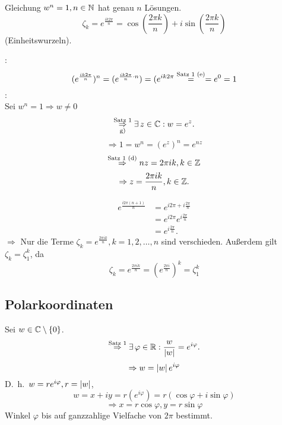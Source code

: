 \documentclass[../ana2.tex]{subfiles}
\begin{document}
\begin{kor}
    Gleichung \( w^n = 1, n \in \mathbb{N} \) hat 
    genau \(n\) Lösungen.
    \[ \zeta_k = e^{\frac{ik2\pi}{n}} 
    = \cos(\frac{2\pi k}{n}) + i \sin(\frac{2\pi k}{n}) \]
    (Einheitswurzeln).
\end{kor}
\begin{bew}
    \gqq{\(\Leftarrow \)}: 
    \[ (e^{\frac{i k 2 \pi}{n}})^n 
    = (e^{\frac{i k 2 \pi}{n} \cdot n}) 
    = (e^{i k 2 \pi} \overset{\text{Satz 1 (e)}}{=} = e^0 = 1 \]
    \gqq{\( \Rightarrow \)}: \\
    Sei \( w^n = 1 \Rightarrow w \neq 0 \)
    \[ \overundersett{Satz 1}{g)}{\Rightarrow} \exists z \in \C: w = e^z. \]
    \[ \Rightarrow 1 = w^n = (e^z)^n = e^{nz} \]
    \[ \overset{\text{Satz 1 (d)}}{\Rightarrow} n z = 2 \pi i k, k\in\mathbb{Z} \]
    \[ \Rightarrow z = \frac{2 \pi i k}{n}, k\in\mathbb{Z}. \]

    \begin{align*}
        e^{ \frac{i 2 \pi (n + 1)}{n} } 
        &= e^{i 2\pi + i \frac{2\pi}{n}} \\
        &= e^{i 2\pi} e^{i \frac{2\pi}{n}} \\
        &= e^{i \frac{2\pi}{n}}.
    \end{align*}
    \( \Rightarrow \) Nur die Terme 
    \( \zeta_k = e^{\frac{2\pi ik}{n}}, k=1,2,\dots,n \)
    sind verschieden.
    Außerdem gilt \( \zeta_k = \zeta_1^k \), da
    \[ \zeta_k = e^{\frac{2\pi ik}{n}} = \left(e^{\frac{2\pi i}{n}}\right)^k 
    = \zeta_1^k \]
\end{bew}
\subsection*{Polarkoordinaten}
Sei \( w\in\mathbb{C} \setminus \{0\} \). 
\[ \oversett{Satz 1}{\Rightarrow} \exists \varphi \in \R: 
\frac{w}{\abs{w}} = e^{i \varphi}. \]
\[ \Rightarrow w = \left|w\right| e^{i\varphi} \]
D.\ h.\ \( w = r e^{i\varphi}, r = \left|w\right| \), 
\[ w = x +iy = r(e^{i\varphi}) = r(\cos \varphi + i\sin \varphi) \]
\[ \Rightarrow x = r\cos \varphi, y = r\sin \varphi \]
Winkel \( \varphi \) bis auf ganzzahlige Vielfache von 
\( 2\pi \) bestimmt.
\end{document}
